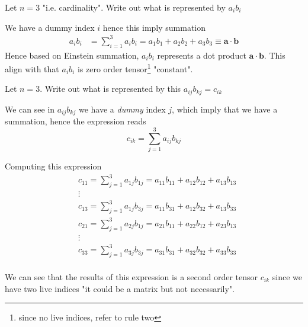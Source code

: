 \documentclass[../main.tex]{subfiles}
\begin{document}
	
	\begin{example}
		Let $n = 3$ "i.e. cardinality". Write out what is represented by $a_i b_i$
	\end{example}
	\begin{solution}
		We have a dummy index $i$ hence this imply summation
		\begin{align*}
			a_i b_i &= \sum_{i=1}^3 a_i b_i = a_1 b_1 + a_2 b_2 + a_3 b_3 \equiv \mathbf{a} \cdot \mathbf{b}
		\end{align*}
		Hence based on Einstein summation, $a_i b_i$ represents a dot product $\mathbf{a} \cdot \mathbf{b}$. This align with that $a_i b_i$ is zero order tensor\footnote{since no live indices, refer to rule two} "constant".
	\end{solution}
		
	\begin{example}
		Let $n = 3$. Write out what is represented by this $a_{ij} b_{kj} = c_{ik}$
	\end{example}
	\begin{solution}
		We can see in $a_{ij} b_{kj}$ we have a \textit{dummy} index $j$, which imply that we have a summation, hence the expression reads
		\begin{equation*}
			c_{ik} = \sum_{j=1}^3 a_{ij} b_{kj}
		\end{equation*}
		
		Computing this expression
		\begin{align*}
			& c_{11} = \sum_{j=1}^3 a_{1j} b_{1j} = a_{11} b_{11} + a_{12} b_{12} + a_{13} b_{13} \\
			& \vdots \\
			& c_{13} = \sum_{j=1}^3 a_{1j} b_{3j} = a_{11} b_{31} + a_{12} b_{32} + a_{13} b_{33} \\
			& c_{21} = \sum_{j=1}^3 a_{2j} b_{1j} = a_{21} b_{11} + a_{22} b_{12} + a_{23} b_{13} \\
			& \vdots \\
			& c_{33} = \sum_{j=1}^3 a_{3j} b_{3j} = a_{31} b_{31} + a_{32} b_{32} + a_{33} b_{33} \\
		\end{align*}
		
		We can see that the results of this expression is a second order tensor $c_{ik}$ since we have two live indices "it could be a matrix but not necessarily".
	\end{solution}
		
\end{document}
